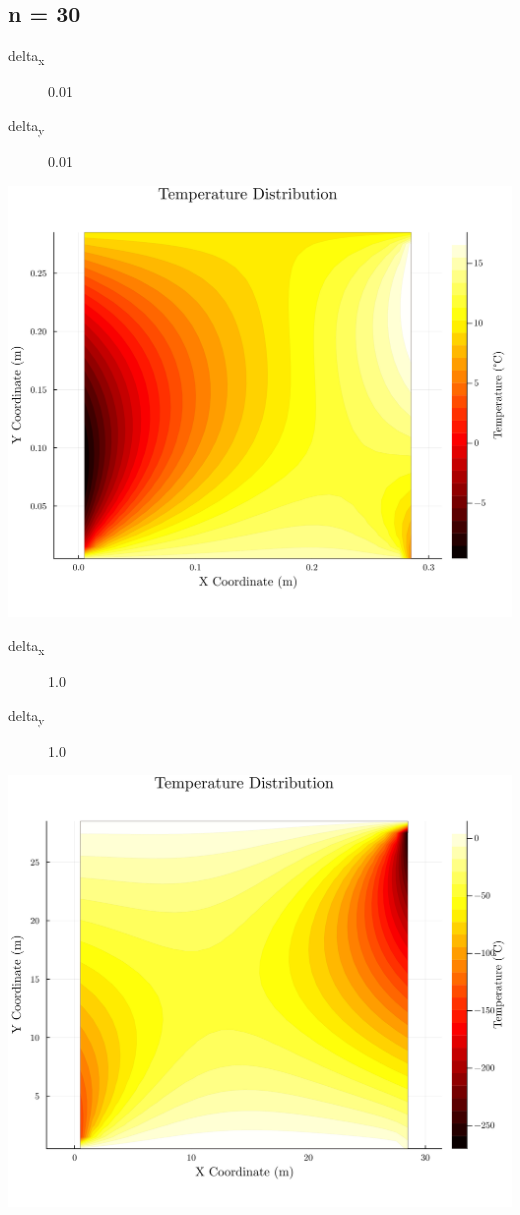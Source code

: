 \documentclass[11pt]{article}
\begin{document}
\subsection{n = 30}
\label{sec:orgae90f54}
\begin{description}
\item[{delta\textsubscript{x}}] 0.01
\item[{delta\textsubscript{y}}] 0.01
\end{description}
\begin{center}
\includegraphics[width=.9\linewidth]{./plot4.png}
\end{center}

\begin{description}
\item[{delta\textsubscript{x}}] 1.0
\item[{delta\textsubscript{y}}] 1.0
\end{description}
\begin{center}
\includegraphics[width=.9\linewidth]{./plot5.png}
\end{center}
\end{document}
